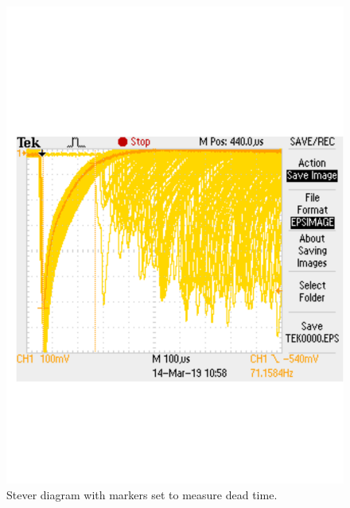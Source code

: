 \begin{figure}[H]
	\centering
	\includegraphics[width=\textwidth]{../Figures/TEK0000.pdf}
	\caption{Stever diagram with markers set to measure dead time.}
	\label{fig:SteverDead}
\end{figure}


